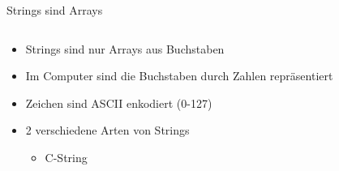 \documentclass[
  german,            %
  aspectratio=169,    %
]{tumbeamer}
\begin{document}
\begin{frame}[c]{Strings sind Arrays}{}
  \begin{columns}[c]
    \begin{column}{0.5\textwidth}
      \begin{itemize}
        \item Strings sind nur Arrays aus Buchstaben
        \item Im Computer sind die Buchstaben durch Zahlen repräsentiert
        \item Zeichen sind ASCII enkodiert (0-127)
        \item 2 verschiedene Arten von Strings
        \begin{itemize}
          \item C-String
\end{itemize}
\end{itemize}
\end{column}
\end{columns}
\end{frame}
\end{document}
